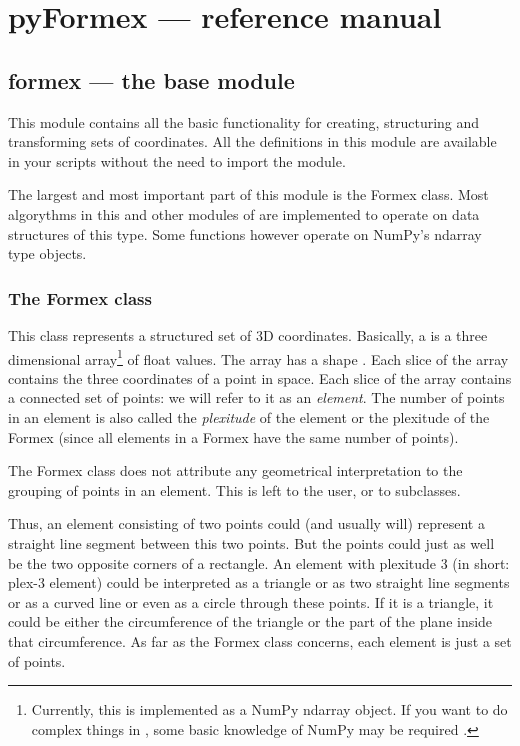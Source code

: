 
\chapter{pyFormex --- reference manual}
\label{cha:reference}

\section{formex --- the base module}
\label{sec:formex}

This module contains all the basic functionality for creating, structuring and transforming sets of coordinates. All the definitions in this module are available in your scripts without the need to import the module.

The largest and most important part of this module is the Formex class. Most algorythms in this and other modules of \pyformex are implemented to operate on data structures of this type. Some functions however operate on NumPy's ndarray type objects.
 

\subsection{The Formex class}
This class represents a structured set of 3D coordinates. Basically, a  is a three dimensional array\footnote{Currently, this is implemented as a NumPy ndarray object. If you want to do complex things in \pyformex, some basic knowledge of NumPy may be required .} of float values. The array has a shape . Each slice \Code{[i,j]} of the array contains the three coordinates of a point in space. Each slice \Code{[i]} of the array contains a connected set of  points: we will refer to it as an \emph{element}. The number of points in an element is also called the \emph{plexitude} of the element or the plexitude of the Formex (since all elements in a Formex have the same number of points). 

The Formex class does not attribute any geometrical interpretation to the grouping of points in an element. This is left to the user, or to subclasses.

Thus, an element consisting of two points could (and usually will) represent a straight line segment between this two points. But the points could just as well be the two opposite corners of a rectangle.
An element with plexitude 3 (in short: plex-3 element) could be interpreted as a triangle or as two straight line segments or as a curved line or even as a circle through these points. If it is a triangle, it could be either the circumference of the triangle or the part of the plane inside that circumference. As far as the Formex class concerns, each element is just a set of points. 

